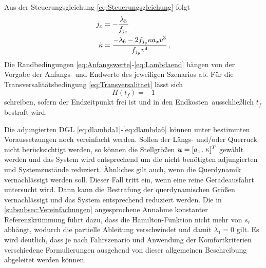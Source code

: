 Aus der Steuerungsgleichung \eqref{eq:Steuerungsgleichung} folgt 
\begin{align}
j_x &= -\frac{\lambda_3}{f_{j_x}}  \label{eq:jx} \\
\dot{\kappa} &= \frac{-\lambda_6-2f_{j_y} \kappa a_xv^3}{f_{j_y} v^4} \label{eq:dkappa}\,,
\end{align}
Die Randbedingungen \eqref{eq:Anfangswerte}-\eqref{eq:Lambdaend} hängen von der Vorgabe der Anfangs- und Endwerte des jeweiligen Szenarios ab. Für die Transversalitätsbedingung \eqref{eq:Transversalitaet} lässt sich 
\begin{equation}
	H(t_f) = -1
\end{equation}
schreiben, sofern der Endzeitpunkt frei ist und in den Endkosten \Vofxoftf\,ausschließlich $t_f$ bestraft wird.

Die adjungierten \gls{DGL} \eqref{eq:dlambda1}-\eqref{eq:dlambda6} können unter bestimmten Voraussetzungen noch vereinfacht werden. Sollen der Längs- und/oder Querruck nicht berücksichtigt werden, so können die Stellgrößen $\boldsymbol{u} = [a_x,\,\kappa]^T$ gewählt werden und das System wird entsprechend um die nicht benötigten adjungierten und Systemzustände reduziert. Ähnliches gilt auch, wenn die Querdynamik vernachlässigt werden soll. Dieser Fall tritt ein, wenn eine reine Geradeausfahrt untersucht wird. Dann kann die Bestrafung der querdynamischen Größen vernachlässigt und das System entsprechend reduziert werden. Die in \ref{subsubsec:Vereinfachungen} angesprochene Annahme konstanter Referenzkrümmung führt dazu, dass die Hamilton-Funktion nicht mehr von $s_r$ abhängt, wodurch die partielle Ableitung verschwindet und damit $\dot{\lambda_1} = 0$ gilt. Es wird deutlich, dass je nach Fahrszenario und Anwendung der Komfortkriterien verschiedene Formulierungen ausgehend von dieser allgemeinen Beschreibung abgeleitet werden können.
